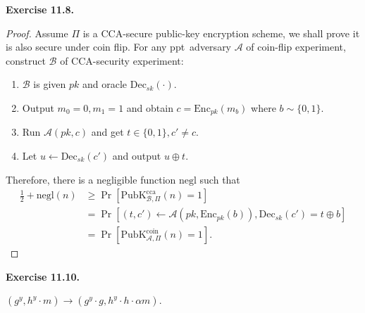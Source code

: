 \documentclass[a4paper]{article}
\newtheorem*{proof}{Proof}
\newenvironment{exercise}[1]{
	\par
	\noindent\textbf{Exercise #1.}\quad
}{
	\par
	\bigskip
}
\newcommand{\sbra}[1]{\left[ #1 \right]}
\newcommand{\bin}{\{0,1\}}
\newcommand{\Enc}{\mathrm{Enc}}
\newcommand{\Dec}{\mathrm{Dec}}
\newcommand{\PubK}{\mathrm{PubK}}
\newcommand{\negl}{\mathrm{negl}}
\newcommand{\ppt}{{\sc ppt}~}
\newcommand{\cca}{\mathrm{cca}}
\newcommand{\Acal}{\mathcal{A}}
\newcommand{\Bcal}{\mathcal{B}}
\begin{document}
\begin{exercise}{11.8}
\begin{itemize}
\begin{proof}
            Assume $\Pi$ is a CCA-secure public-key encryption scheme, we shall prove it is also secure under coin flip.
            For any \ppt adversary $\Acal$ of coin-flip experiment, construct $\Bcal$ of CCA-security experiment:
            \begin{enumerate}
                \item $\Bcal$ is given $pk$ and oracle $\Dec_{sk}(\cdot)$.
                \item Output $m_0=0,m_1=1$ and obtain $c=\Enc_{pk}(m_b)$ where $b\sim\bin$.
                \item Run $\Acal(pk,c)$ and get $t\in\bin,c'\neq c$.
                \item Let $u\gets\Dec_{sk}(c')$ and output $u\oplus t$.
            \end{enumerate}
            Therefore, there is a negligible function $\negl$ such that
            \begin{align*}
                \frac12+\negl(n)&\geq\Pr\sbra{\PubK_{\Bcal,\Pi}^\cca(n)=1}\\
                &=\Pr\sbra{(t,c')\gets\Acal(pk,\Enc_{pk}(b)),\Dec_{sk}(c')=t\oplus b}\\
                &=\Pr\sbra{\PubK_{\Acal,\Pi}^{\mathrm{coin}}(n)=1}.
            \end{align*}
        \end{proof}
\end{itemize}
\end{exercise}

\begin{exercise}{11.10}
    $(g^y,h^y\cdot m)\to (g^{y}\cdot g,h^{y}\cdot h\cdot\alpha m)$.
\end{exercise}
\end{document}
